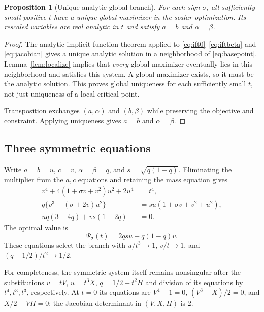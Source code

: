\documentclass[11pt]{article}
\newtheorem{proposition}[theorem]{Proposition}
\theoremstyle{definition}
\newcommand{\1}{\mathbf 1}
\begin{document}
\begin{proposition}[Unique analytic global branch]\label{prop:branch}
For each sign $\sigma$, all sufficiently small positive $t$ have a unique global maximizer in the scalar optimization. Its rescaled variables are real analytic in $t$ and satisfy $a=b$ and $\alpha=\beta$.
\end{proposition}
\begin{proof}
The analytic implicit-function theorem applied to \eqref{eq:ift0}--\eqref{eq:iftbeta} and \eqref{eq:jacobian} gives a unique analytic solution in a neighborhood of \eqref{eq:basepoint}. Lemma~\ref{lem:localize} implies that \emph{every} global maximizer eventually lies in this neighborhood and satisfies this system. A global maximizer exists, so it must be the analytic solution. This proves global uniqueness for each sufficiently small $t$, not just uniqueness of a local critical point.

Transposition exchanges $(a,\alpha)$ and $(b,\beta)$ while preserving the objective and constraint. Applying uniqueness gives $a=b$ and $\alpha=\beta$.
\end{proof}

\subsection{Three symmetric equations}
Write $a=b=u$, $c=v$, $\alpha=\beta=q$, and $s=\sqrt{q(1-q)}$. Eliminating the multiplier from the $a,c$ equations and retaining the mass equation gives
\begin{align}
 v^4+4(1+\sigma v+v^2)u^2+2u^4&=t^4,\label{eq:symnorm}\\
 q\{v^3+(\sigma+2v)u^2\}&=su(1+\sigma v+v^2+u^2),\label{eq:symratio}\\
 uq(3-4q)+vs(1-2q)&=0.\label{eq:symmass}
\end{align}
The optimal value is
\begin{equation}\label{eq:phiform}
 \Psi_\sigma(t)=2qsu+q(1-q)v.
\end{equation}
These equations select the branch with $u/t^3\to1$, $v/t\to1$, and $(q-1/2)/t^2\to1/2$.

For completeness, the symmetric system itself remains nonsingular after the substitutions $v=tV$, $u=t^3X$, $q=1/2+t^2H$ and division of its equations by $t^4,t^3,t^3$, respectively. At $t=0$ its equations are $V^4-1=0$, $(V^3-X)/2=0$, and $X/2-VH=0$; the Jacobian determinant in $(V,X,H)$ is $2$.
\end{document}
